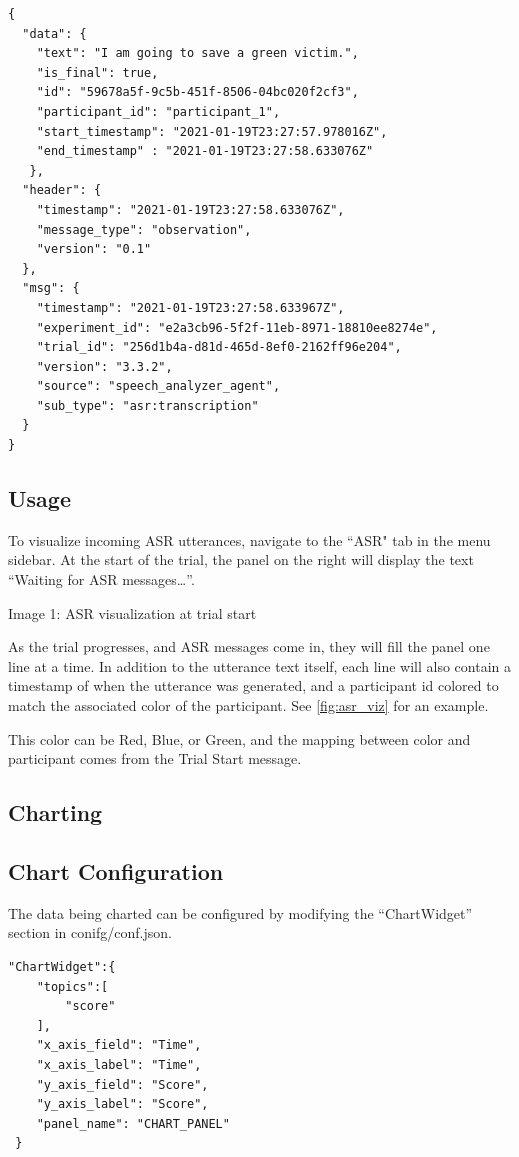\begin{verbatim}
{
  "data": {
    "text": "I am going to save a green victim.",
    "is_final": true,
    "id": "59678a5f-9c5b-451f-8506-04bc020f2cf3",
    "participant_id": "participant_1",
    "start_timestamp": "2021-01-19T23:27:57.978016Z",
    "end_timestamp" : "2021-01-19T23:27:58.633076Z"
   },
  "header": {
    "timestamp": "2021-01-19T23:27:58.633076Z",
    "message_type": "observation",
    "version": "0.1"
  },
  "msg": {
    "timestamp": "2021-01-19T23:27:58.633967Z",
    "experiment_id": "e2a3cb96-5f2f-11eb-8971-18810ee8274e",
    "trial_id": "256d1b4a-d81d-465d-8ef0-2162ff96e204",
    "version": "3.3.2",
    "source": "speech_analyzer_agent",
    "sub_type": "asr:transcription"
  }
}
\end{verbatim}


\subsection{Usage}

To visualize incoming ASR utterances, navigate to the ``ASR" tab in the menu
sidebar. At the start of the trial, the panel on the right will display the text
``Waiting for ASR messages…''.

Image 1: ASR visualization at trial start

As the trial progresses, and ASR messages come in, they will fill the panel one
line at a time. In addition to the utterance text itself, each line will also
contain a timestamp of when the utterance was generated, and a participant id
colored to match the associated color of the participant. See
\autoref{fig:asr_viz} for an example.

This color can be Red, Blue, or Green, and the mapping between color and
participant comes from the Trial Start message.

\subsection{Charting}

\subsection{Chart Configuration}

The data being charted can be configured by modifying the ``ChartWidget” section in conifg/conf.json.

\begin{verbatim}
"ChartWidget":{
    "topics":[
        "score"
    ],
    "x_axis_field": "Time",
    "x_axis_label": "Time",
    "y_axis_field": "Score",
    "y_axis_label": "Score",
    "panel_name": "CHART_PANEL"
 }
\end{verbatim}

